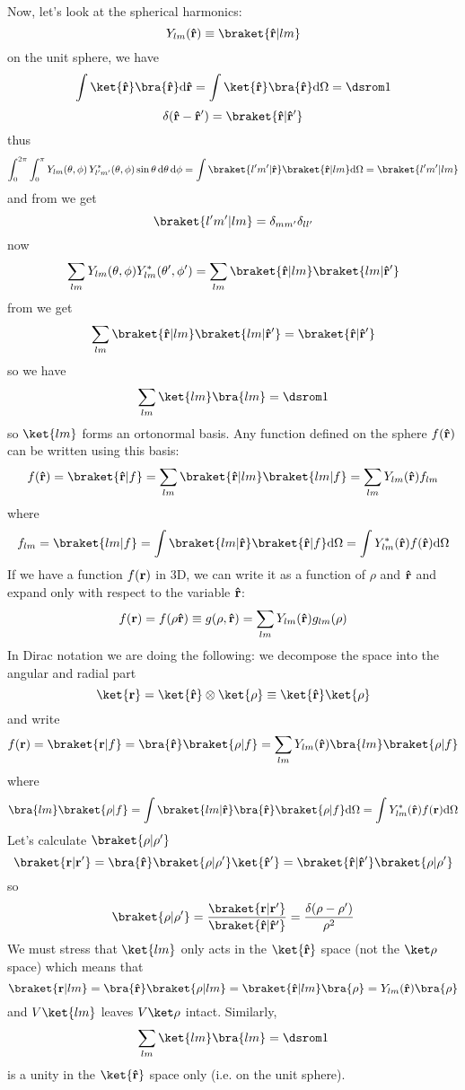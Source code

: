 Now, let's look at the spherical harmonics:
$$Y_{lm}({\bf\hat r})\equiv\braket{{\bf\hat r}|lm}$$
on the unit sphere, we have
$$\int\ket{\bf\hat r}\bra{\bf\hat r}\d{\bf\hat r}=
\int\ket{\bf\hat r}\bra{\bf\hat r}\d\Omega=\one$$
$$\delta({\bf\hat r}-{\bf\hat r'})=\braket{{\bf\hat r}|{\bf\hat r'}}$$
thus
$$\int_0^{2\pi}\int_0^{\pi}
Y_{lm}(\theta,\phi)\,Y^*_{l'm'}(\theta,\phi)\sin\theta\,\d\theta\,\d\phi = 
\int\braket{l'm'|{\bf\hat r}}\braket{{\bf\hat r}|lm}\d\Omega=
\braket{l'm'|lm}
$$
and from  we get
$$\braket{l'm'|lm}=\delta_{mm'}\delta_{ll'}$$
now
$$\sum_{lm}Y_{lm}(\theta,\phi)Y_{lm}^*(\theta',\phi')=
\sum_{lm}\braket{{\bf\hat r}|lm}\braket{lm|{\bf\hat r'}}
$$
from  we get
$$\sum_{lm}\braket{{\bf\hat r}|lm}\braket{lm|{\bf\hat r'}}=
\braket{{\bf\hat r}|{\bf\hat r'}}$$
so we have
$$\sum_{lm}\ket{lm}\bra{lm}=\one$$
so $\ket{lm}$ forms an ortonormal basis. Any function defined on the sphere
$f({\bf\hat r})$ can be written using this basis:
$$f({\bf\hat r})
=\braket{{\bf\hat r}|f}
=\sum_{lm}\braket{{\bf\hat r}|lm}\braket{lm|f}
=\sum_{lm}Y_{lm}({\bf\hat r})f_{lm}
$$
where
$$
f_{lm}=\braket{lm|f}=\int\braket{lm|{\bf\hat r}}\braket{{\bf\hat r}|f}\d\Omega
=\int Y_{lm}^*({\bf\hat r}) f({\bf\hat r})\d\Omega
$$
If we have a function $f({\bf r})$ in 3D, we can write it as a function of
$\rho$ and ${\bf\hat r}$ and expand only with respect to the variable
${\bf\hat r}$: 
$$f({\bf r})=f(\rho{\bf\hat r})\equiv g(\rho,{\bf\hat r})=
\sum_{lm}Y_{lm}({\bf\hat r})g_{lm}(\rho)
$$
In Dirac notation we are doing the following: we decompose the space 
into the angular and radial part
$$\ket{{\bf r}}=\ket{{\bf\hat r}}\otimes\ket{\rho}
\equiv\ket{{\bf\hat r}}\ket{\rho}
$$
and write
$$f({\bf r})=\braket{{\bf r}|f}=\bra{{\bf\hat r}}\braket{\rho|f}=
\sum_{lm}Y_{lm}({\bf\hat r})\bra{lm}\braket{\rho|f}
$$
where
$$\bra{lm}\braket{\rho|f}=
\int\braket{lm|{\bf\hat r}}\bra{{\bf\hat r}}\braket{\rho|f}\d\Omega
=\int Y_{lm}^*({\bf\hat r}) f({\bf r})\d\Omega
$$
Let's calculate $\braket{\rho|\rho'}$
$$
\braket{{\bf r}|{\bf r'}}=\bra{\bf\hat r}\braket{\rho|\rho'}\ket{{\bf\hat r'}}
=\braket{{\bf\hat r}|{\bf\hat r'}}\braket{\rho|\rho'}
$$
so
$$\braket{\rho|\rho'}
={\braket{{\bf r}|{\bf r'}}\over\braket{{\bf\hat r}|{\bf\hat r'}}}
={\delta(\rho-\rho')\over\rho^2}$$
We must stress that $\ket{lm}$ only acts in the $\ket{{\bf\hat r}}$ space (not
the $\ket\rho$ space) which means that
$$\braket{{\bf r}|lm}
=\bra{\bf\hat r}\braket{\rho|lm}
=\braket{{\bf\hat r}|lm}\bra{\rho}
=Y_{lm}({\bf\hat r})\bra{\rho}
$$
and $V\ket{lm}$ leaves $V\ket\rho$ intact. Similarly,
$$\sum_{lm} \ket{lm}\bra{lm}=\one$$
is a unity in the $\ket{\bf\hat r}$ space only (i.e. on the unit sphere).

